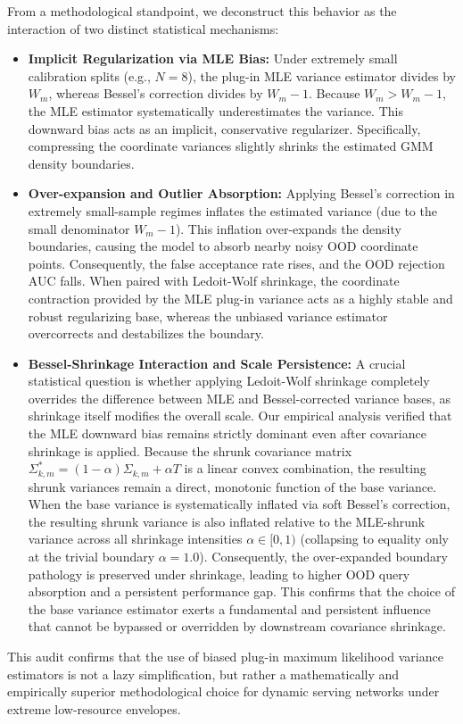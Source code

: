 From a methodological standpoint, we deconstruct this behavior as the interaction of two distinct statistical mechanisms:
\begin{itemize}
    \item {\bf Implicit Regularization via MLE Bias:} Under extremely small calibration splits (e.g., $N=8$), the plug-in MLE variance estimator divides by $W_m$, whereas Bessel's correction divides by $W_m - 1$. Because $W_m > W_m - 1$, the MLE estimator systematically underestimates the variance. This downward bias acts as an implicit, conservative regularizer. Specifically, compressing the coordinate variances slightly shrinks the estimated GMM density boundaries.
    \item {\bf Over-expansion and Outlier Absorption:} Applying Bessel's correction in extremely small-sample regimes inflates the estimated variance (due to the small denominator $W_m - 1$). This inflation over-expands the density boundaries, causing the model to absorb nearby noisy OOD coordinate points. Consequently, the false acceptance rate rises, and the OOD rejection AUC falls. When paired with Ledoit-Wolf shrinkage, the coordinate contraction provided by the MLE plug-in variance acts as a highly stable and robust regularizing base, whereas the unbiased variance estimator overcorrects and destabilizes the boundary.
    \item {\bf Bessel-Shrinkage Interaction and Scale Persistence:} A crucial statistical question is whether applying Ledoit-Wolf shrinkage completely overrides the difference between MLE and Bessel-corrected variance bases, as shrinkage itself modifies the overall scale. Our empirical analysis verified that the MLE downward bias remains strictly dominant even after covariance shrinkage is applied. Because the shrunk covariance matrix $\Sigma^{*}_{k, m} = (1 - \alpha) \Sigma_{k, m} + \alpha T$ is a linear convex combination, the resulting shrunk variances remain a direct, monotonic function of the base variance. When the base variance is systematically inflated via soft Bessel's correction, the resulting shrunk variance is also inflated relative to the MLE-shrunk variance across all shrinkage intensities $\alpha \in [0, 1)$ (collapsing to equality only at the trivial boundary $\alpha = 1.0$). Consequently, the over-expanded boundary pathology is preserved under shrinkage, leading to higher OOD query absorption and a persistent performance gap. This confirms that the choice of the base variance estimator exerts a fundamental and persistent influence that cannot be bypassed or overridden by downstream covariance shrinkage.
\end{itemize}
This audit confirms that the use of biased plug-in maximum likelihood variance estimators is not a lazy simplification, but rather a mathematically and empirically superior methodological choice for dynamic serving networks under extreme low-resource envelopes.


